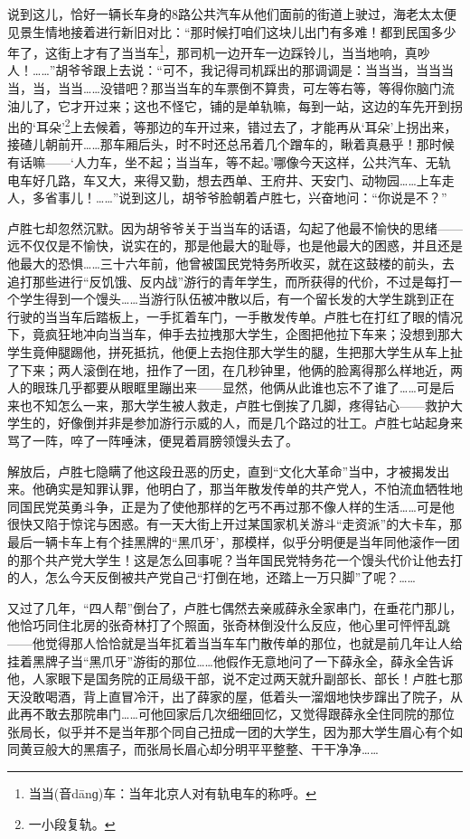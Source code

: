 \par 说到这儿，恰好一辆长车身的8路公共汽车从他们面前的街道上驶过，海老太太便见景生情地接着进行新旧对比：“那时候打咱们这块儿出门有多难！都到民国多少年了，这街上才有了当当车\footnote{当当(音dānɡ)车：当年北京人对有轨电车的称呼。}，那司机一边开车一边踩铃儿，当当地响，真吵人！……”胡爷爷跟上去说：“可不，我记得司机踩出的那调调是：当当当，当当当当，当，当当……没错吧？那当当车的车票倒不算贵，可左等右等，等得你脑门流油儿了，它才开过来；这也不怪它，铺的是单轨嘛，每到一站，这边的车先开到拐出的‘耳朵’\footnote{一小段复轨。}上去候着，等那边的车开过来，错过去了，才能再从‘耳朵’上拐出来，接碴儿朝前开……那车厢后头，时不时还总吊着几个蹭车的，瞅着真悬乎！那时候有话嘛——‘人力车，坐不起；当当车，等不起。’哪像今天这样，公共汽车、无轨电车好几路，车又大，来得又勤，想去西单、王府井、天安门、动物园……上车走人，多省事儿！……”说到这儿，胡爷爷脸朝着卢胜七，兴奋地问：“你说是不？”
\par 卢胜七却忽然沉默。因为胡爷爷关于当当车的话语，勾起了他最不愉快的思绪——远不仅仅是不愉快，说实在的，那是他最大的耻辱，也是他最大的困惑，并且还是他最大的恐惧……三十六年前，他曾被国民党特务所收买，就在这鼓楼的前头，去追打那些进行“反饥饿、反内战”游行的青年学生，而所获得的代价，不过是每打一个学生得到一个馒头……当游行队伍被冲散以后，有一个留长发的大学生跳到正在行驶的当当车后踏板上，一手㧟着车门，一手散发传单。卢胜七在打红了眼的情况下，竟疯狂地冲向当当车，伸手去拉拽那大学生，企图把他拉下车来；没想到那大学生竟伸腿踢他，拼死抵抗，他便上去抱住那大学生的腿，生把那大学生从车上扯了下来；两人滚倒在地，扭作了一团，在几秒钟里，他俩的脸离得那么样地近，两人的眼珠几乎都要从眼眶里蹦出来——显然，他俩从此谁也忘不了谁了……可是后来也不知怎么一来，那大学生被人救走，卢胜七倒挨了几脚，疼得钻心——救护大学生的，好像倒并非是参加游行示威的人，而是几个路过的壮工。卢胜七站起身来骂了一阵，啐了一阵唾沫，便晃着肩膀领馒头去了。
\par 解放后，卢胜七隐瞒了他这段丑恶的历史，直到“文化大革命”当中，才被揭发出来。他确实是知罪认罪，他明白了，那当年散发传单的共产党人，不怕流血牺牲地同国民党英勇斗争，正是为了使他那样的乞丐不再过那不像人样的生活……可是他很快又陷于惊诧与困惑。有一天大街上开过某国家机关游斗“走资派”的大卡车，那最后一辆卡车上有个挂黑牌的“黑爪牙’，那模样，似乎分明便是当年同他滚作一团的那个共产党大学生！这是怎么回事呢？当年国民党特务花一个馒头代价让他去打的人，怎么今天反倒被共产党自己“打倒在地，还踏上一万只脚”了呢？……
\par 又过了几年，“四人帮”倒台了，卢胜七偶然去亲戚薛永全家串门，在垂花门那儿，他恰巧同住北房的张奇林打了个照面，张奇林倒没什么反应，他心里可怦怦乱跳——他觉得那人恰恰就是当年㧟着当当车车门散传单的那位，也就是前几年让人给挂着黑牌子当“黑爪牙”游街的那位……他假作无意地问了一下薛永全，薛永全告诉他，人家眼下是国务院的正局级干部，说不定过两天就升副部长、部长！卢胜七那天没敢喝酒，背上直冒冷汗，出了薛家的屋，低着头一溜烟地快步蹿出了院子，从此再不敢去那院串门……可他回家后几次细细回忆，又觉得跟薛永全住同院的那位张局长，似乎并不是当年那个同自己扭成一团的大学生，因为那大学生眉心有个如同黄豆般大的黑痦子，而张局长眉心却分明平平整整、干干净净……
